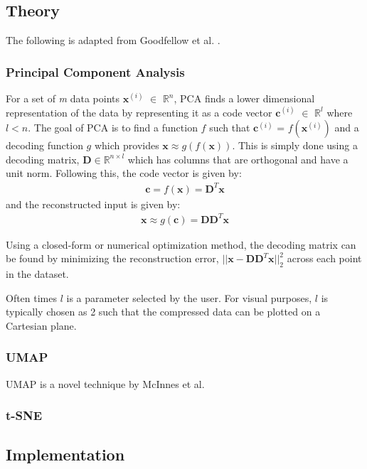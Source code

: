 \documentclass[12pt]{article}
\begin{document}
\subsection{Theory}
The following is adapted from Goodfellow et al. \cite{GoodBengCour16}.

\subsubsection{Principal Component Analysis}
For a set of \textit{m} data points $\textbf{x}^{(i)}$ $\in$ $\mathbb{R}^n$, PCA finds a lower dimensional representation of the data by representing it as a code vector $\textbf{c}^{(i)}$ $\in$ $\mathbb{R}^l$ where $l < n$. The goal of PCA is to find a function $f$ such that $\textbf{c}^{(i)}$ = $f(\textbf{x}^{(i)})$ and a decoding function $g$ which provides $\textbf{x} \approx g(f(\textbf{x}))$. This is simply done using a decoding matrix, $\textbf{D} \in \mathbb{R}^{n \times l}$ which has columns that are orthogonal and have a unit norm. Following this, the code vector is given by:
\begin{align*}
        \textbf{c} = f(\textbf{x}) = \textbf{D}^T\textbf{x}
\end{align*}
and the reconstructed input is given by:
\begin{align*}
        \textbf{x} \approx g(\textbf{c}) = \textbf{D}\textbf{D}^T\textbf{x}
\end{align*} 

Using a closed-form or numerical optimization method, the decoding matrix can be found by minimizing the reconstruction error, $||\textbf{x} - \textbf{D}\textbf{D}^T\textbf{x}||_2^2$ across each point in the dataset.
 
Often times $l$ is a parameter selected by the user. For visual purposes, $l$ is typically chosen as 2 such that the compressed data can be plotted on a Cartesian plane.

\subsubsection{UMAP}
UMAP is a novel technique by McInnes et al. 

\subsubsection{t-SNE}

\subsection{Implementation}
\end{document}
